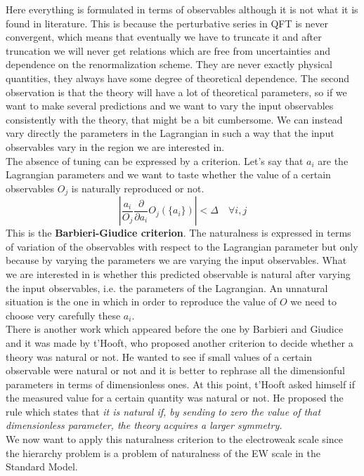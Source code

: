 \documentclass[../main.tex]{subfiles}
\begin{document}
Here everything is formulated in terms of observables although it is not what it is found in literature. This is because the perturbative series in QFT is never convergent, which means that eventually we have to truncate it and after truncation we will never get relations which are free from uncertainties and dependence on the renormalization scheme. They are never exactly physical quantities, they always have some degree of theoretical dependence. The second observation is that the theory will have a lot of theoretical parameters, so if we want to make several predictions and we want to vary the input observables consistently with the theory, that might be a bit cumbersome. We can instead vary directly the parameters in the Lagrangian in such a way that the input observables vary in the region we are interested in.\\
The absence of tuning can be expressed by a criterion. Let's say that $a_i$ are the Lagrangian parameters and we want to taste whether the value of a certain observables $O_j$ is naturally reproduced or not. 
\[
\left|\frac{a_i}{O_j}\frac{\partial}{\partial a_i}O_j(\{a_i\})\right|<\Delta \quad \forall i,j
\]
This is the \textbf{Barbieri-Giudice criterion}. The naturalness is expressed in terms of variation of the observables with respect to the Lagrangian parameter but only because by varying the parameters we are varying the input observables. What we are interested in is whether this predicted observable is natural after varying the input observables, i.e. the parameters of the Lagrangian. An unnatural situation is the one in which in order to reproduce the value of $O$ we need to choose very carefully these $a_i$.\\
There is another work which appeared before the one by Barbieri and Giudice and it was made by t'Hooft, who proposed another criterion to decide whether a theory was natural or not. He wanted to see if small values of a certain observable were natural or not and it is better to rephrase all the dimensionful parameters in terms of dimensionless ones. At this point, t'Hooft asked himself if the measured value for a certain quantity was natural or not. He proposed the rule which states that \textit{it is natural if, by sending to zero the value of that dimensionless parameter, the theory acquires a larger symmetry.}\\
We now want to apply this naturalness criterion to the electroweak scale since the hierarchy problem is a problem of naturalness of the EW scale in the Standard Model.\\
\end{document}
